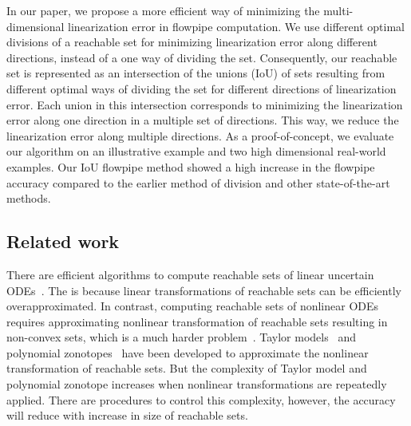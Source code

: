 In our paper, we propose a more efficient way of minimizing the
multi-dimensional linearization error in flowpipe computation.  We use
different optimal divisions of a reachable set for minimizing
linearization error along different directions, instead of a one way
of dividing the set.  Consequently, our reachable set is represented as
an intersection of the unions (IoU) of sets resulting from different
optimal ways of dividing the set for different directions of
linearization error.  Each union in this intersection corresponds to
minimizing the linearization error along one direction in a multiple
set of directions.  This way, we reduce the linearization error along
multiple directions.  As a proof-of-concept, we evaluate our algorithm
on an illustrative example and two high dimensional real-world
examples. Our IoU flowpipe method showed a high increase in the flowpipe accuracy
compared to the earlier method of division and other state-of-the-art
methods.

\subsection{Related work}
There are efficient algorithms to compute reachable sets of linear
uncertain
ODEs~\cite{girard2005reachability,FLD+11,girard2008efficient,bak2017simulation}.
The is because linear transformations of reachable sets can be
efficiently overapproximated.  In contrast, computing reachable sets
of nonlinear ODEs requires approximating nonlinear transformation of
reachable sets resulting in non-convex sets, which is a much harder
problem~\cite{dang2009image,monniaux2011generation}.  Taylor
models~\cite{chen2012taylor} and polynomial
zonotopes~\cite{althoff2013reachability,kochdumper2020sparse,kochdumper2020constrained}
have been developed to approximate the nonlinear transformation of
reachable sets.  But the complexity of Taylor model and polynomial
zonotope increases when nonlinear transformations are repeatedly
applied.  There are procedures to control this complexity, however,
the accuracy will reduce with increase in size of reachable sets.

